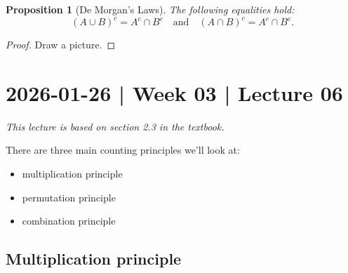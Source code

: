 \documentclass[10pt]{article}
\newtheorem{proposition}[theorem]{Proposition}
\theoremstyle{definition}
\newcommand{\1}[1]{\textbf{1}_{\left[#1\right]}} %
\def\P{\mathbb{P}} %
\begin{document}


\begin{proposition}[De Morgan's Laws]
  \label{prop:de-morgans-laws}
  The following equalities hold:
  \begin{equation*}
    \left( A\cup B \right)^{c} = A^{c}\cap B^{c}
    \quad \text{and} \quad 
    \left( A\cap B \right)^{c} = A^{c}\cap B^{c}.
  \end{equation*}
\end{proposition}
\begin{proof}
  Draw a picture.
\end{proof}



\newpage
\section{2026-01-26 | Week 03 | Lecture 06}

\textit{This lecture is based on section 2.3 in the textbook.}

There are three main counting principles we'll look at:
\begin{itemize}
  \item multiplication principle
  \item permutation principle
  \item combination principle
\end{itemize}

\subsection{Multiplication principle}
\end{document}
